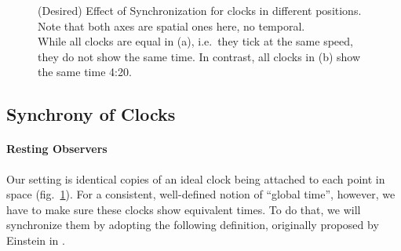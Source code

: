 \begin{figure}
	\centering
	
	\hspace*{0.1\textwidth}
	
	\caption[Effect of Synchronization]{(Desired) Effect of Synchronization for clocks in different positions. Note that both axes are spatial ones here, no temporal.\\
	While all clocks are equal in (a), i.e.~they tick at the same speed, they do not show the same time. In contrast, all clocks in (b) show the same time 4:20.}
	\label{fig:unsynchr_synchr_clocks}
\end{figure}



		\subsection{Synchrony of Clocks}
			\paragraph{Resting Observers}
Our setting is identical copies of an ideal clock being attached to each point in space (fig.~\ref{fig:unsynchr_synchr_clocks}). For a consistent, well-defined notion of \enquote{global time}, however, we have to make sure these clocks show equivalent times. To do that, we will synchronize them by adopting the following definition, originally proposed by Einstein in \cite{Einstein_1905}.

